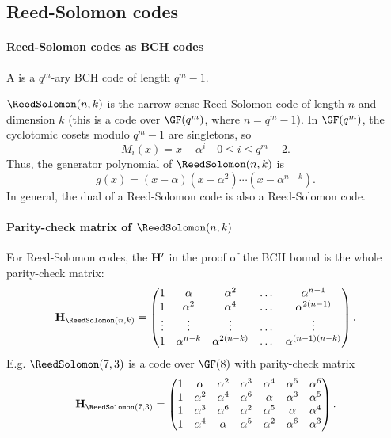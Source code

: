 \documentclass[a4paper, 11pt, openany]{book}
\begin{document}
\subsection{Reed-Solomon codes}

\paragraph{Reed-Solomon codes as BCH codes}

A  is a $q^m$-ary BCH code of length $q^m - 1$.

$\ReedSolomon(n,k)$ is the narrow-sense Reed-Solomon code of length $n$ and dimension $k$ (this is a code over $\GF(q^m)$, where $n = q^m-1$). In $\GF(q^m)$, the cyclotomic cosets modulo $q^m - 1$ are singletons, so
\[
    M_i(x) = x - \alpha^i \quad 0 \le i \le q^m - 2.
\]
Thus, the generator polynomial of $\ReedSolomon(n,k)$ is
\[
	g(x) = (x - \alpha) (x - \alpha^2) \cdots (x - \alpha^{n-k}).
\]
In general, the dual of a Reed-Solomon code is also a Reed-Solomon code.


\paragraph{Parity-check matrix of $\ReedSolomon(n,k)$}
For Reed-Solomon codes, the ${\bf H}'$ in the proof of the BCH bound is the whole parity-check matrix:
\[
	{\bf H}_{\ReedSolomon(n,k)} = \begin{pmatrix}
	1 & \alpha & \alpha^2 & \dots & \alpha^{n-1}\\
	1 & \alpha^2 & \alpha^4 & \dots & \alpha^{2(n-1)}\\
	\vdots & \vdots & \vdots & \dots & \vdots\\
	1 & \alpha^{n-k} & \alpha^{2(n-k)} & \dots & \alpha^{(n-1)(n-k)}
	\end{pmatrix}.
\]
E.g. $\ReedSolomon(7,3)$ is a code over $\GF(8)$ with parity-check matrix
$$
	{\bf H}_{\ReedSolomon(7,3)} = \begin{pmatrix}
	1 & \alpha   & \alpha^2 & \alpha^3 & \alpha^4 & \alpha^5 & \alpha^6\\
	1 & \alpha^2 & \alpha^4 & \alpha^6 & \alpha   & \alpha^3 & \alpha^5\\
	1 & \alpha^3 & \alpha^6 & \alpha^2 & \alpha^5 & \alpha   & \alpha^4\\
	1 & \alpha^4 & \alpha   & \alpha^5 & \alpha^2 & \alpha^6 & \alpha^3
	\end{pmatrix}.
$$
\end{document}
